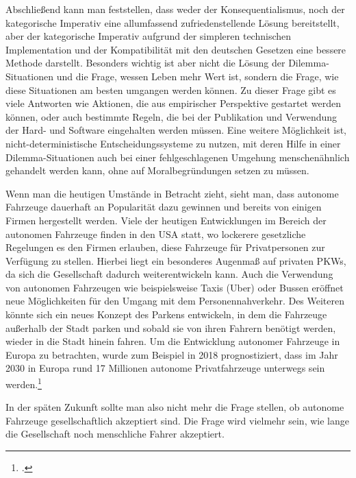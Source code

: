 \documentclass[a4paper, 12pt, openany]{book}
\begin{document}
        Abschließend kann man feststellen, dass weder der Konsequentialismus, noch der kategorische Imperativ eine allumfassend zufriedenstellende Lösung bereitstellt, aber der kategorische Imperativ aufgrund der simpleren technischen Implementation und der Kompatibilität mit den deutschen Gesetzen eine bessere Methode darstellt. Besonders wichtig ist aber nicht die Lösung der Dilemma-Situationen und die Frage, wessen Leben mehr Wert ist, sondern die Frage, wie diese Situationen am besten umgangen werden können. Zu dieser Frage gibt es viele Antworten wie Aktionen, die aus empirischer Perspektive gestartet werden können, oder auch bestimmte Regeln, die bei der Publikation und Verwendung der Hard- und Software eingehalten werden müssen. Eine weitere Möglichkeit ist, nicht-deterministische Entscheidungssysteme zu nutzen, mit deren Hilfe in einer Dilemma-Situationen auch bei einer fehlgeschlagenen Umgehung menschenähnlich gehandelt werden kann, ohne auf Moralbegründungen setzen zu müssen.
        
        Wenn man die heutigen Umstände in Betracht zieht, sieht man, dass autonome Fahrzeuge dauerhaft an Popularität dazu gewinnen und bereits von einigen Firmen hergestellt werden. Viele der heutigen Entwicklungen im Bereich der autonomen Fahrzeuge finden in den USA statt, wo lockerere gesetzliche Regelungen es den Firmen erlauben, diese Fahrzeuge für Privatpersonen zur Verfügung zu stellen. Hierbei liegt ein besonderes Augenmaß auf privaten PKWs, da sich die Gesellschaft dadurch weiterentwickeln kann. Auch die Verwendung von autonomen Fahrzeugen wie beispielsweise Taxis (Uber) oder Bussen eröffnet neue Möglichkeiten für den Umgang mit dem Personennahverkehr.
        Des Weiteren könnte sich ein neues Konzept des Parkens entwickeln, in dem die Fahrzeuge außerhalb der Stadt parken und sobald sie von ihren Fahrern benötigt werden, wieder in die Stadt hinein fahren.
        Um die Entwicklung autonomer Fahrzeuge in Europa zu betrachten, wurde zum Beispiel in 2018 prognostiziert, dass im Jahr 2030 in Europa rund 17 Millionen autonome Privatfahrzeuge unterwegs sein werden.\footcite{autoprognose2018}\par
        In der späten Zukunft sollte man also nicht mehr die Frage stellen, ob autonome Fahrzeuge gesellschaftlich akzeptiert sind. Die Frage wird vielmehr sein, wie lange die Gesellschaft noch menschliche Fahrer akzeptiert. 

    \printbibliography[heading=bibintoc, title={Literaturverzeichnis}, nottype=online, nottype=misc]
    \printbibliography[heading=bibintoc, title={Quellenverzeichnis}, type=online, nottype=misc, resetnumbers=true]
    
    \newrefcontext[sorting=none]
    \printbibliography[heading=bibintoc, title={Abbildungsverzeichnis}, type=misc, resetnumbers=true]
    
\end{document}
